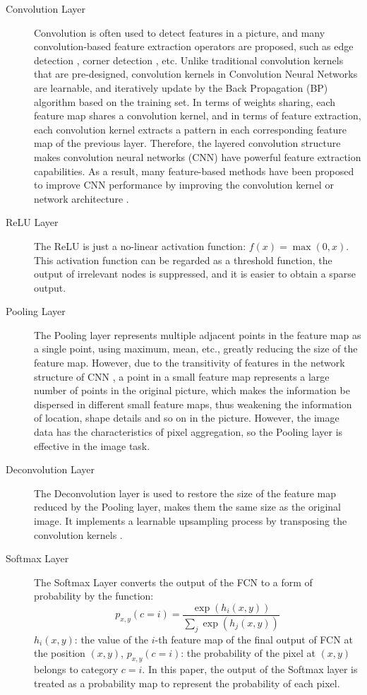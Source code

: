 \begin{description}
  \item[Convolution Layer] Convolution is often used to detect features in a picture, and many convolution-based feature extraction operators are proposed, such as edge detection \cite{Convolution:edge:canny1987computational}, corner detection \cite{Convolution:corner:harris1988combined}, etc. Unlike traditional convolution kernels that are pre-designed, convolution kernels in Convolution Neural Networks are learnable, and iteratively update by the Back Propagation (BP) algorithm based on the training set. In terms of weights sharing, each feature map shares a convolution kernel, and in terms of feature extraction, each convolution kernel extracts a pattern in each corresponding feature map of the previous layer. Therefore, the layered convolution structure makes convolution neural networks (CNN) have powerful feature extraction capabilities. As a result, many feature-based methods have been proposed to improve CNN performance by improving the convolution kernel \cite{CNN:kernel:zhou2017oriented} or network architecture \cite{CNN:arch:he2016deep}.
  \item[ReLU Layer] The ReLU is just a no-linear activation function: $f(x) = \max(0,x)$. This activation function can be regarded as a threshold function, the output of irrelevant nodes is suppressed, and it is easier to obtain a sparse output.
  \item[Pooling Layer] The Pooling layer represents multiple adjacent points in the feature map as a single point, using maximum, mean, etc., greatly reducing the size of the feature map. However, due to the transitivity of features in the network structure of CNN \cite{CNN:pooling:zhou2016learning}, a point in a small feature map represents a large number of points in the original picture, which makes the information be dispersed in different small feature maps, thus weakening the information of location, shape details and so on in the picture. However, the image data has the characteristics of pixel aggregation, so the Pooling layer is effective in the image task.
  \item[Deconvolution Layer] The Deconvolution layer is used to restore the size of the feature map reduced by the Pooling layer, makes them the same size as the original image. It implements a learnable upsampling process by transposing the convolution kernels \cite{CNN:deconvolution:zeiler2011adaptive}.
  \item[Softmax Layer] The Softmax Layer converts the output of the FCN to a form of probability by the function:
      $$p_{x,y}(c=i) = \frac{\exp(h_i(x,y))}{\sum_j \exp(h_j(x,y))}$$
      $h_i(x,y)$: the value of the $i$-th feature map of the final output of FCN at the position $(x,y)$, $p_{x,y}(c=i)$: the probability of the pixel at $(x,y)$ belongs to category $c=i$. In this paper, the output of the Softmax layer is treated as a probability map to represent the probability of each pixel.
\end{description}

